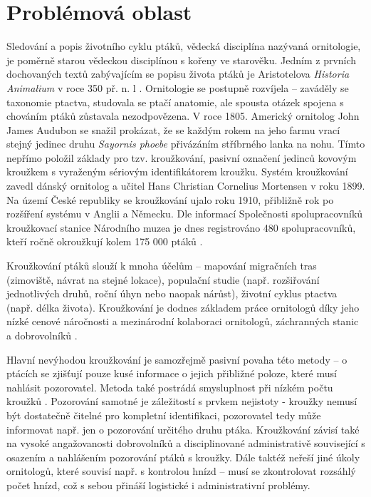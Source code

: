 
\chapter{Problémová oblast}{\tiny }


Sledování a popis životního cyklu ptáků, vědecká disciplína nazývaná ornitologie, je poměrně starou vědeckou disciplínou s kořeny  ve starověku. Jedním z prvních dochovaných textů zabývajícím se popisu života ptáků je Aristotelova \emph{Historia Animalium} v roce 350 př. n. l \cite{historiaAnimalium}. Ornitologie se postupně rozvíjela -- zaváděly se taxonomie ptactva, studovala se ptačí anatomie, ale spousta otázek spojena s chováním ptáků zůstavala nezodpovězena. V roce 1805. Americký ornitolog John James Audubon se snažil prokázat, že se každým rokem na jeho farmu vrací stejný jedinec druhu \emph{Sayornis phoebe} přivázáním stříbrného lanka na nohu. Tímto nepřímo položil základy pro tzv. kroužkování, pasivní označení jedinců kovovým kroužkem s vyraženým sériovým identifikátorem kroužku. Systém kroužkování zavedl dánský ornitolog a učitel Hans Christian Cornelius Mortensen v roku 1899. Na území České republiky se kroužkování ujalo roku 1910, přibližně rok po rozšíření systému v Anglii a Německu. Dle informací Společnosti spolupracovníků kroužkovací stanice Národního muzea je dnes registrováno 480 spolupracovníků, kteří ročně okroužkují kolem 175 000 ptáků \cite{krouzkovaniPtakuHistorie}.

Kroužkování ptáků slouží k mnoha účelům -- mapování migračních tras (zimoviště, návrat na stejné lokace), populační studie (např. rozšiřování jednotlivých druhů, roční úhyn nebo naopak nárůst), životní cyklus ptactva (např. délka života). Kroužkování je dodnes základem práce ornitologů díky jeho nízké cenové náročnosti a mezinárodní kolaboraci ornitologů, záchranných stanic a dobrovolníků \cite{krouzkovaniPtaku}. %

Hlavní nevýhodou kroužkování je samozřejmě pasivní povaha této metody -- o ptácích se zjišťují pouze kusé informace o jejich přibližné poloze, které musí nahlásit pozorovatel. Metoda také postrádá smysluplnost při nízkém počtu kroužků \cite{sokolov2011modern}. Pozorování samotné je záležitostí s prvkem nejistoty - kroužky nemusí být dostatečně čitelné pro kompletní identifikaci, pozorovatel tedy může informovat např. jen o pozorování určitého druhu ptáka. Kroužkování závisí také na vysoké angažovanosti dobrovolníků a disciplinované administrativě související s osazením a nahlášením pozorování ptáků s kroužky. Dále taktéž neřeší jiné úkoly ornitologů, které souvisí např. s kontrolou hnízd -- musí se zkontrolovat rozsáhlý počet hnízd, což s sebou přináší logistické i administrativní problémy.

